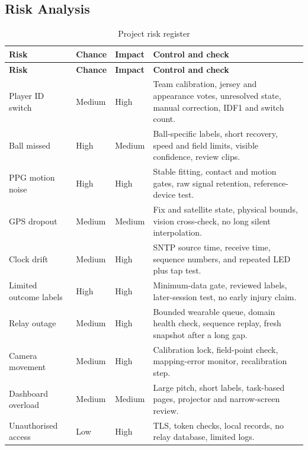 \subsection{Risk Analysis}
\begin{longtable}{@{}p{1.1in}>{\centering\arraybackslash}p{0.65in}>{\centering\arraybackslash}p{0.6in}p{3.35in}@{}}
\caption{Project risk register}\label{tab:risk_register}\\
\toprule
\textbf{Risk} & \textbf{Chance} & \textbf{Impact} & \textbf{Control and check}\\
\midrule
\endfirsthead
\toprule
\textbf{Risk} & \textbf{Chance} & \textbf{Impact} & \textbf{Control and check}\\
\midrule
\endhead
Player ID switch & Medium & High & Team calibration, jersey and appearance votes, unresolved state, manual correction, IDF1 and switch count.\\
Ball missed & High & Medium & Ball-specific labels, short recovery, speed and field limits, visible confidence, review clips.\\
PPG motion noise & High & High & Stable fitting, contact and motion gates, raw signal retention, reference-device test.\\
GPS dropout & Medium & Medium & Fix and satellite state, physical bounds, vision cross-check, no long silent interpolation.\\
Clock drift & Medium & High & SNTP source time, receive time, sequence numbers, and repeated LED plus tap test.\\
Limited outcome labels & High & High & Minimum-data gate, reviewed labels, later-session test, no early injury claim.\\
Relay outage & Medium & High & Bounded wearable queue, domain health check, sequence replay, fresh snapshot after a long gap.\\
Camera movement & Medium & High & Calibration lock, field-point check, mapping-error monitor, recalibration step.\\
Dashboard overload & Medium & Medium & Large pitch, short labels, task-based pages, projector and narrow-screen review.\\
Unauthorised access & Low & High & TLS, token checks, local records, no relay database, limited logs.\\
\bottomrule
\end{longtable}
